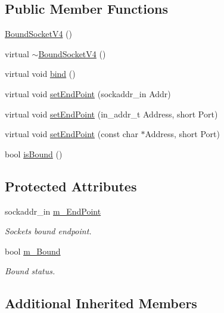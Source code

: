 \subsection*{Public Member Functions}
\begin{DoxyCompactItemize}
\item 
\hyperlink{classBoundSocketV4_a6de624ded6ab107a35c5420bacaa75ae}{Bound\+Socket\+V4} ()
\item 
virtual \hyperlink{classBoundSocketV4_a4cdcca1dc8bdcf1af76ac34fe07bc84f}{$\sim$\+Bound\+Socket\+V4} ()
\item 
virtual void \hyperlink{classBoundSocketV4_ad7165f6b77c9c813352179fcf3910b54}{bind} ()
\item 
virtual void \hyperlink{classBoundSocketV4_ac1985788415bf47dd7c91980e5079f1a}{set\+End\+Point} (sockaddr\+\_\+in Addr)
\item 
virtual void \hyperlink{classBoundSocketV4_a908a6e916879fc18585fef69d0518171}{set\+End\+Point} (in\+\_\+addr\+\_\+t Address, short Port)
\item 
virtual void \hyperlink{classBoundSocketV4_a5d3bb922ff5727df01e20782b546714e}{set\+End\+Point} (const char $\ast$Address, short Port)
\item 
bool \hyperlink{classBoundSocketV4_aa7a4ecb65ba394e04763bf486de67d4e}{is\+Bound} ()
\end{DoxyCompactItemize}
\subsection*{Protected Attributes}
\begin{DoxyCompactItemize}
\item 
sockaddr\+\_\+in \hyperlink{classBoundSocketV4_ac19d591b590885f2d34c4b49ba8672db}{m\+\_\+\+End\+Point}
\begin{DoxyCompactList}\small\item\em Socket\textquotesingle{}s bound endpoint. \end{DoxyCompactList}\item 
bool \hyperlink{classBoundSocketV4_a88412526307c31c1843010e5aad30dc7}{m\+\_\+\+Bound}
\begin{DoxyCompactList}\small\item\em Bound status. \end{DoxyCompactList}\end{DoxyCompactItemize}
\subsection*{Additional Inherited Members}


